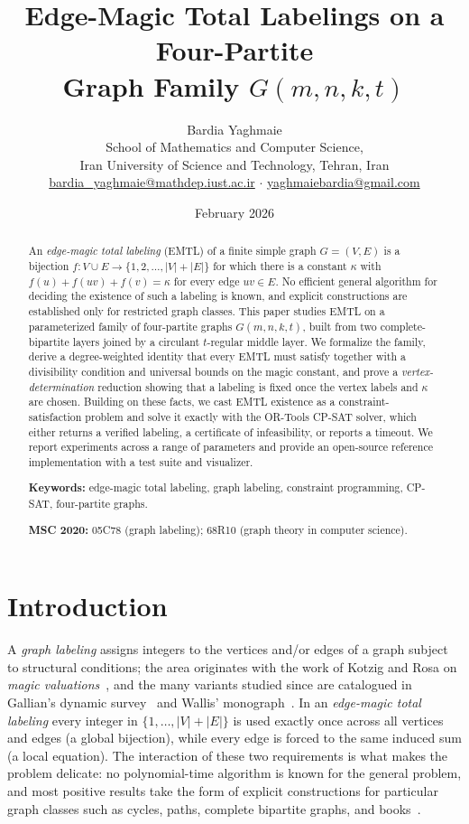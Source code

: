 \documentclass[11pt,a4paper]{article}
\title{\textbf{Edge-Magic Total Labelings on a Four-Partite\\ Graph Family $G(m,n,k,t)$}}
\author{
  Bardia Yaghmaie\\[2pt]
  \small School of Mathematics and Computer Science,\\
  \small Iran University of Science and Technology, Tehran, Iran\\
  \small \href{mailto:bardia_yaghmaie@mathdep.iust.ac.ir}{bardia\_yaghmaie@mathdep.iust.ac.ir} $\cdot$ \href{mailto:yaghmaiebardia@gmail.com}{yaghmaiebardia@gmail.com}
}
\date{February 2026}
\theoremstyle{plain}
\theoremstyle{definition}
\theoremstyle{remark}
\newcommand{\km}{\kappa}
\newcommand{\Gfam}{G(m,n,k,t)}
\begin{document}
\maketitle

\begin{abstract}
\noindent
An \emph{edge-magic total labeling} (EMTL) of a finite simple graph $G=(V,E)$ is a
bijection $f\colon V\cup E\to\{1,2,\dots,|V|+|E|\}$ for which there is a constant
$\km$ with $f(u)+f(uv)+f(v)=\km$ for every edge $uv\in E$. No efficient general
algorithm for deciding the existence of such a labeling is known, and explicit
constructions are established only for restricted graph classes.
This paper studies EMTL on a parameterized family of four-partite graphs
$\Gfam$, built from two complete-bipartite layers joined by a circulant
$t$-regular middle layer. We formalize the family, derive a degree-weighted
identity that every EMTL must satisfy together with a divisibility condition and
universal bounds on the magic constant, and prove a \emph{vertex-determination}
reduction showing that a labeling is fixed once the vertex labels and $\km$ are
chosen. Building on these facts, we cast EMTL existence as a constraint-satisfaction
problem and solve it exactly with the OR-Tools CP-SAT solver, which either returns
a verified labeling, a certificate of infeasibility, or reports a timeout. We
report experiments across a range of parameters and provide an open-source
reference implementation with a test suite and visualizer.

\medskip
\noindent\textbf{Keywords:} edge-magic total labeling, graph labeling,
constraint programming, CP-SAT, four-partite graphs.

\medskip
\noindent\textbf{MSC 2020:} 05C78 (graph labeling); 68R10 (graph theory in computer science).
\end{abstract}

\section{Introduction}\label{sec:intro}

A \emph{graph labeling} assigns integers to the vertices and/or edges of a graph
subject to structural conditions; the area originates with the work of Kotzig and
Rosa on \emph{magic valuations}~\cite{kotzig-rosa}, and the many variants studied
since are catalogued in Gallian's dynamic survey~\cite{gallian} and Wallis'
monograph~\cite{wallis}. In an \emph{edge-magic total labeling} every integer in
$\{1,\dots,|V|+|E|\}$ is used exactly once across all vertices and edges (a global
bijection), while every edge is forced to the same induced sum (a local equation).
The interaction of these two requirements is what makes the problem delicate: no
polynomial-time algorithm is known for the general problem, and most positive results
take the form of explicit constructions for particular graph classes such as cycles,
paths, complete bipartite graphs, and books~\cite{kotzig-rosa,wbms,gallian,kite}.
\end{document}
